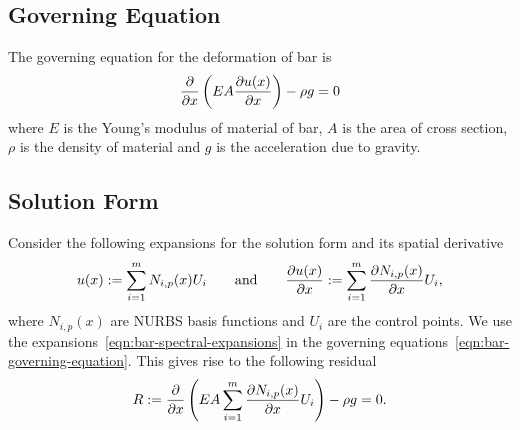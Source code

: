 \documentclass[submit,12pt]{aiaa-pretty} %
\begin{document}
\subsection{Governing Equation}
The governing equation for the deformation of bar is
\begin{equation}\label{eqn:bar-governing-equation}
  \dfrac{\partial }{\partial x} \left( EA \dfrac{\partial u(x)}{\partial x} \right) - \rho g  = 0
\end{equation}
where $E$ is the Young's modulus of material of bar, $A$ is the area
of cross section, $\rho$ is the density of material and $g$ is the
acceleration due to gravity.
\subsection{Solution Form}
Consider the following expansions for the
solution form and its spatial derivative
\begin{equation}\label{eqn:bar-spectral-expansions}
  u(x) := \sum_{i=1}^{m} N_{i,p}(x) U_i \qquad \mathrm{and} \qquad \dfrac{\partial u(x)}{\partial x} := \sum_{i=1}^{m} \dfrac{\partial N_{i,p}(x)}{\partial x}  U_i,
\end{equation}
where $N_{i,p}(x)$ are NURBS basis functions and $U_i$ are the control
points. We use the expansions~\eqref{eqn:bar-spectral-expansions} in
the governing equations~\eqref{eqn:bar-governing-equation}. This gives
rise to the following residual
\begin{equation}\label{eqn:bar-governing-equation}
  R := \dfrac{\partial }{\partial x} \left( EA  \sum_{i=1}^{m} \dfrac{\partial N_{i,p}(x)}{\partial x}  U_i \right) - \rho g  = 0.
\end{equation}
\end{document}
